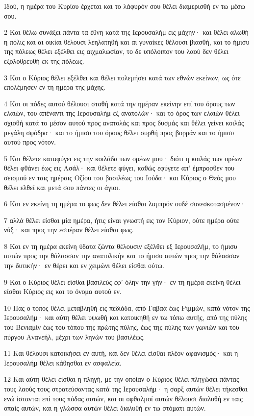 \par Ιδού, η ημέρα του Κυρίου έρχεται και το λάφυρόν σου θέλει διαμερισθή εν τω μέσω σου.
\par 2 Και θέλω συνάξει πάντα τα έθνη κατά της Ιερουσαλήμ εις μάχην· και θέλει αλωθή η πόλις και αι οικίαι θέλουσι λεηλατηθή και αι γυναίκες θέλουσι βιασθή, και το ήμισυ της πόλεως θέλει εξέλθει εις αιχμαλωσίαν, το δε υπόλοιπον του λαού δεν θέλει εξολοθρευθή εκ της πόλεως.
\par 3 Και ο Κύριος θέλει εξέλθει και θέλει πολεμήσει κατά των εθνών εκείνων, ως ότε επολέμησεν εν τη ημέρα της μάχης.
\par 4 Και οι πόδες αυτού θέλουσι σταθή κατά την ημέραν εκείνην επί του όρους των ελαιών, του απέναντι της Ιερουσαλήμ εξ ανατολών· και το όρος των ελαιών θέλει σχισθή κατά το μέσον αυτού προς ανατολάς και προς δυσμάς και θέλει γείνει κοιλάς μεγάλη σφόδρα· και το ήμισυ του όρους θέλει συρθή προς βορράν και το ήμισυ αυτού προς νότον.
\par 5 Και θέλετε καταφύγει εις την κοιλάδα των ορέων μου· διότι η κοιλάς των ορέων θέλει φθάνει έως εις Ασάλ· και θέλετε φύγει, καθώς εφύγετε απ' έμπροσθεν του σεισμού εν ταις ημέραις Οζίου του βασιλέως του Ιούδα· και Κύριος ο Θεός μου θέλει ελθεί και μετά σου πάντες οι άγιοι.
\par 6 Και εν εκείνη τη ημέρα το φως δεν θέλει είσθαι λαμπρόν ουδέ συνεσκοτασμένον·
\par 7 αλλά θέλει είσθαι μία ημέρα, ήτις είναι γνωστή εις τον Κύριον, ούτε ημέρα ούτε νύξ· και προς την εσπέραν θέλει είσθαι φως.
\par 8 Και εν τη ημέρα εκείνη ύδατα ζώντα θέλουσιν εξέλθει εξ Ιερουσαλήμ, το ήμισυ αυτών προς την θάλασσαν την ανατολικήν και το ήμισυ αυτών προς την θάλασσαν την δυτικήν· εν θέρει και εν χειμώνι θέλει είσθαι ούτω.
\par 9 Και ο Κύριος θέλει είσθαι βασιλεύς εφ' όλην την γήν· εν τη ημέρα εκείνη θέλει είσθαι Κύριος εις και το όνομα αυτού εν.
\par 10 Πας ο τόπος θέλει μεταβληθή εις πεδιάδα, από Γαβαά έως Ριμμών, κατά νότον της Ιερουσαλήμ· και αύτη θέλει υψωθή και κατοικηθή εν τω τόπω αυτής, από της πύλης του Βενιαμίν έως του τόπου της πρώτης πύλης, έως της πύλης των γωνιών και του πύργου Ανανεήλ, μέχρι των ληνών του βασιλέως.
\par 11 Και θέλουσι κατοικήσει εν αυτή, και δεν θέλει είσθαι πλέον αφανισμός· και η Ιερουσαλήμ θέλει κάθησθαι εν ασφαλεία.
\par 12 Και αύτη θέλει είσθαι η πληγή, με την οποίαν ο Κύριος θέλει πληγώσει πάντας τους λαούς τους στρατεύσαντας κατά της Ιερουσαλήμ· η σαρξ αυτών θέλει τήκεσθαι ενώ ίστανται επί τους πόδας αυτών, και οι οφθαλμοί αυτών θέλουσι διαλυθή εν ταις οπαίς αυτών, και η γλώσσα αυτών θέλει διαλυθή εν τω στόματι αυτών.
